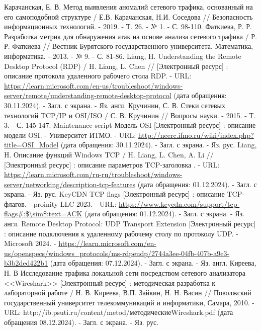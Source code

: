\documentclass[bachelor, och, coursework]{SCWorks}
\begin{document}
\begin{thebibliography}{20}
    Карачанская, Е. В. Метод выявления аномалий сетевого трафика, основанный на его самоподобной структуре / Е.В. Карачанская, Н.И. Соседова // 
    Безопасность информационных технологий. - 2019. - Т. 26. - № 1. - С. 98-110.
    Фаткиева, Р. Р. Разработка метрик для обнаружения атак на основе анализа сетевого трафика / Р. Р. Фаткиева // Вестник Бурятского государственного университета. 
    Математика, информатика. - 2013. - № 9. - С. 81-86.
    Liang, H. Understanding the Remote Desktop Protocol (RDP) / H. Liang, L. Chen // [Электронный ресурс] : описание протокола удаленного рабочего стола RDP. - 
    URL: \url{https://learn.microsoft.com/en-us/troubleshoot/windows-server/remote/understanding-remote-desktop-protocol} (дата обращения: 30.11.2024). - Загл. с экрана. - Яз. англ.
    Кручинин, С. В. Стеки сетевых технологий TCP/IP и OSI/ISO / С. В. Кручинин // Вопросы науки. - 2015. - Т. 3. - С. 145-147.
    Maintenance script Модель OSI [Электронный ресурс] : описание модели OSI. - Университет ИТМО. - URL: \url{http://neerc.ifmo.ru/wiki/index.php?title=OSI_Model}
    (дата обращения: 30.11.2024). - Загл. с экрана. - Яз. рус.
    Liang, H. Описание функций Windows TCP /  H. Liang, L. Chen, A. Li // [Электронный ресурс] : описание параметров TCP-заголовка . - URL: 
    \url{https://learn.microsoft.com/ru-ru/troubleshoot/windows-server/networking/description-tcp-features} (дата обращения: 01.12.2024). - Загл. с экрана. -  Яз. рус.
    KeyCDN TCP flags [Электронный ресурс] : описание TCP-флагов. - proinity LLC 2023. - URL: \url{https://www.keycdn.com/support/tcp-flags\#:$\sim$:text=ACK}
    (дата обращения: 01.12.2024). - Загл. с экрана. -  Яз. англ.
    Remote Desktop Protocol: UDP Transport Extension [Электронный ресурс] : описание подключения к удаленному рабочему столу по протоколу UDP. - Microsoft 2024. - 
    \url{https://learn.microsoft.com/en-us/openspecs/windows_protocols/ms-rdpeudp/2744a3ee-04fb-407b-a9e3-b3b2ded422b1} (дата обращения: 07.12.2024). - Загл. с экрана. -  Яз. англ.
    Киреева, Н. В Исследование трафика локальной сети посредством сетевого анализатора <<Wireshark>> [Электронный ресурс] : методическая разработка к лабораторной работе / Н. В. Киреева, В.П. Зайкин, Н. Н. Васин // Поволжский государственный университет телекоммуникаций и информатики, Самара, 2010. - URL: http://ib.psuti.ru/content/metod/методическиеWireshark.pdf (дата обращения 08.12.2024). - Загл. с экрана. - Яз. рус.

\end{thebibliography}
\end{document}

